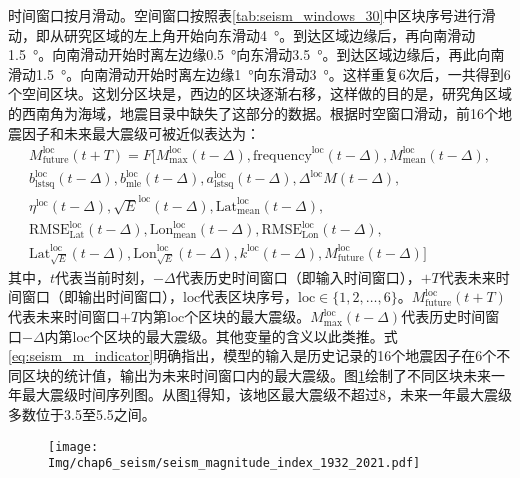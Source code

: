 时间窗口按月滑动。空间窗口按照表\ref{tab:seism_windows_30}中区块序号进行滑动，即从研究区域的左上角开始向东滑动\SI{4}{\degree}。到达区域边缘后，再向南滑动\SI{1.5}{\degree}。向南滑动开始时离左边缘\SI{0.5}{\degree}向东滑动\SI{3.5}{\degree}。到达区域边缘后，再此向南滑动\SI{1.5}{\degree}。向南滑动开始时离左边缘\SI{1}{\degree}向东滑动\SI{3}{\degree}。这样重复6次后，一共得到6个空间区块。这划分区块是，西边的区块逐渐右移，这样做的目的是，研究角区域的西南角为海域，地震目录中缺失了这部分的数据。根据时空窗口滑动，前16个地震因子和未来最大震级可被近似表达为：
\begin{equation}
  \label{eq:seism_m_indicator}
  \begin{split}
    M_{\mathrm{future}}^{\mathrm{loc}}(t+T)=F[M_{\mathrm{max}}^{\mathrm{loc}}(t-\Delta),\mathrm{frequency}^{\text{loc}}(t-\Delta),M_{\mathrm{mean}}^{\text{loc}}(t-\Delta),\\
    b_{\mathrm{lstsq}}^{\text{loc}}(t-\Delta),b_{\mathrm{mle}}^{\text{loc}}(t-\Delta),a_{\mathrm{lstsq}}^{\text{loc}}(t-\Delta),\Delta^{\text{loc}}M(t-\Delta),\\
    \eta^{\text{loc}}(t-\Delta),\sqrt{E}^{\text{loc}}(t-\Delta),\mathrm{Lat}_{\mathrm{mean}}^{\text{loc}}(t-\Delta),\\
    \mathrm{RMSE}_{\mathrm{Lat}}^{\text{loc}}(t-\Delta),\mathrm{Lon}_{\mathrm{mean}}^{\text{loc}}(t-\Delta),\mathrm{RMSE}_{\mathrm{Lon}}^{\text{loc}}(t-\Delta),\\
    \mathrm{Lat}^{\text{loc}}_{\sqrt{E}}(t-\Delta),\mathrm{Lon}^{\text{loc}}_{\sqrt{E}}(t-\Delta),k^{\text{loc}}(t-\Delta),M_{\mathrm{future}}^{\text{loc}}(t-\Delta)]
  \end{split}
\end{equation}
其中，$t$代表当前时刻，$-\Delta$代表历史时间窗口（即输入时间窗口），$+T$代表未来时间窗口（即输出时间窗口），$\text{loc}$代表区块序号，$\text{loc}\in\{1,2,\ldots,6\}$。$M_{\mathrm{future}}^{\text{loc}}(t+T)$代表未来时间窗口$+T$内第$\text{loc}$个区块的最大震级。$M_{\mathrm{max}}^{\mathrm{loc}}(t-\Delta)$代表历史时间窗口$-\Delta$内第$\text{loc}$个区块的最大震级。其他变量的含义以此类推。式\ref{eq:seism_m_indicator}明确指出，模型的输入是历史记录的16个地震因子在6个不同区块的统计值，输出为未来时间窗口内的最大震级。图\ref{fig:seism_magnitude_index_1932_2021}绘制了不同区块未来一年最大震级时间序列图。从图\ref{fig:seism_magnitude_index_1932_2021}得知，该地区最大震级不超过8，未来一年最大震级多数位于3.5至5.5之间。

\begin{figure}[!htbp]
  \centering
  \texttt{[image: Img/chap6\_seism/seism\_magnitude\_index\_1932\_2021.pdf]}
  \vspace{-1cm}
  \label{fig:seism_magnitude_index_1932_2021}
\end{figure}

